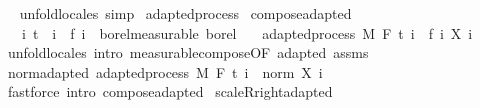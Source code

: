 \begin{isabellebody}
\isadelimproof
\ %
\endisadelimproof
%
\isatagproof
{}\isamarkupfalse%
\ {\isacharparenleft}{\kern0pt}unfold{\isacharunderscore}{\kern0pt}locales{\isacharparenright}{\kern0pt}\ simp%
\endisatagproof
{\isafoldproof}%
%
\isadelimproof
%
\endisadelimproof
\isanewline
\isanewline
{}\isamarkupfalse%
\ adapted{\isacharunderscore}{\kern0pt}process\isanewline
{}\isanewline
\isanewline
{}\isamarkupfalse%
\ compose{\isacharunderscore}{\kern0pt}adapted{\isacharcolon}{\kern0pt}\isanewline
\ \ \ {\isachardoublequoteopen}{\isasymAnd}i{\isachardot}{\kern0pt}\ t\ {\isasymle}\ i\ {\isasymLongrightarrow}\ f\ i\ {\isasymin}\ borel{\isacharunderscore}{\kern0pt}measurable\ borel{\isachardoublequoteclose}\isanewline
\ \ \ {\isachardoublequoteopen}adapted{\isacharunderscore}{\kern0pt}process\ M\ F\ t\ {\isacharparenleft}{\kern0pt}{\isasymlambda}i\ {\isasymxi}{\isachardot}{\kern0pt}\ {\isacharparenleft}{\kern0pt}f\ i{\isacharparenright}{\kern0pt}\ {\isacharparenleft}{\kern0pt}X\ i\ {\isasymxi}{\isacharparenright}{\kern0pt}{\isacharparenright}{\kern0pt}{\isachardoublequoteclose}\isanewline
%
\isadelimproof
\ \ %
\endisadelimproof
%
\isatagproof
{}\isamarkupfalse%
\ {\isacharparenleft}{\kern0pt}unfold{\isacharunderscore}{\kern0pt}locales{\isacharparenright}{\kern0pt}\ {\isacharparenleft}{\kern0pt}intro\ measurable{\isacharunderscore}{\kern0pt}compose{\isacharbrackleft}{\kern0pt}OF\ adapted\ assms{\isacharbrackright}{\kern0pt}{\isacharparenright}{\kern0pt}%
\endisatagproof
{\isafoldproof}%
%
\isadelimproof
\isanewline
%
\endisadelimproof
\isanewline
{}\isamarkupfalse%
\ norm{\isacharunderscore}{\kern0pt}adapted{\isacharcolon}{\kern0pt}\ {\isachardoublequoteopen}adapted{\isacharunderscore}{\kern0pt}process\ M\ F\ t\ {\isacharparenleft}{\kern0pt}{\isasymlambda}i\ {\isasymxi}{\isachardot}{\kern0pt}\ norm\ {\isacharparenleft}{\kern0pt}X\ i\ {\isasymxi}{\isacharparenright}{\kern0pt}{\isacharparenright}{\kern0pt}{\isachardoublequoteclose}%
\isadelimproof
\ %
\endisadelimproof
%
\isatagproof
{}\isamarkupfalse%
\ {\isacharparenleft}{\kern0pt}fastforce\ intro{\isacharcolon}{\kern0pt}\ compose{\isacharunderscore}{\kern0pt}adapted{\isacharparenright}{\kern0pt}%
\endisatagproof
{\isafoldproof}%
%
\isadelimproof
%
\endisadelimproof
\isanewline
\isanewline
{}\isamarkupfalse%
\ scaleR{\isacharunderscore}{\kern0pt}right{\isacharunderscore}{\kern0pt}adapted{\isacharcolon}{\kern0pt}\isanewline

\end{isabellebody}
